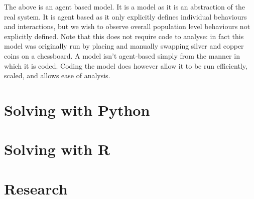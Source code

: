 The above is an agent based model.
It is a model as it is an abstraction of the real system.
It is agent based as it only explicitly defines individual behaviours and
interactions, but we wish to observe overall population level behaviours not
explicitly defined.
Note that this does not require code to analyse: in fact this model was
originally run by placing and manually swapping silver and copper coins on a
chessboard.
A model isn't agent-based simply from the manner in which it is coded.
Coding the model does however allow it to be run efficiently, scaled, and allows
ease of analysis.


\section{Solving with Python}\label{sec:solving-with-python}

\section{Solving with R}\label{sec:solving-with-R}

\section{Research}\label{sec:research}
